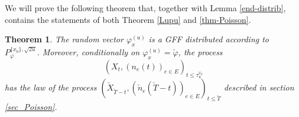 \documentclass[11pt,a4paper]{amsart}
\numberwithin{equation}{section}
\newtheorem{theorem}{Theorem}
\begin{document}
We will prove the following theorem that, together with Lemma \ref{end-distrib}, contains the statements of both Theorem \ref{Lupu} and \ref{thm-Poisson}.
\begin{theorem}\label{thm-Poisson2}
The random vector $\varphi^{(u)}_x$ is a GFF distributed according to $P_{\varphi}^{\{x_0\},\sqrt{2u}}$.
Moreover, conditionally on $\varphi^{(u)}_x=\check \varphi$, the process 
$$(X_{t},(n_{e}(t))_{e\in E})_{t\le \tau_u^{x_0}}$$ 
has the law of the process $(\check X_{\check T-t },(\check n_e(\check T -t))_{e\in E})_{t\le \check T}$
described in section \ref{sec_Poisson}.
\end{theorem} 
\end{document}
